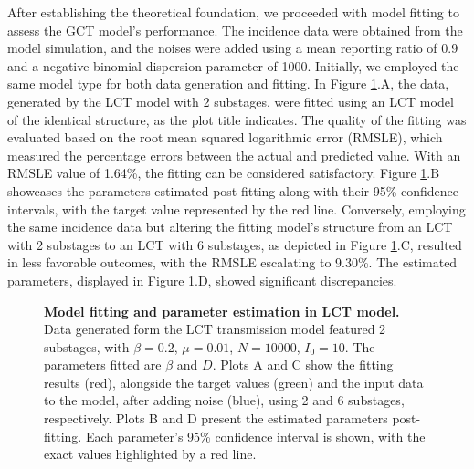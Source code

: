 \documentclass[12pt]{article}
\begin{document}
After establishing the theoretical foundation, we proceeded with model fitting to assess the GCT model's performance. The incidence data were obtained from the model simulation, and the noises were added using a mean reporting ratio of 0.9 and a negative binomial dispersion parameter of 1000. Initially, we employed the same model type for both data generation and fitting. In Figure \ref{sametypeFittingL}.A, the data, generated by the LCT model with 2 substages, were fitted using an LCT model of the identical structure, as the plot title indicates. The quality of the fitting was evaluated based on the root mean squared logarithmic error (RMSLE), which measured the percentage errors between the actual and predicted value. With an RMSLE value of 1.64\%, the fitting can be considered satisfactory. Figure \ref{sametypeFittingL}.B showcases the parameters estimated post-fitting along with their 95\% confidence intervals, with the target value represented by the red line. Conversely, employing the same incidence data but altering the fitting model's structure from an LCT with 2 substages to an LCT with 6 substages, as depicted in Figure \ref{sametypeFittingL}.C, resulted in less favorable outcomes, with the RMSLE escalating to 9.30\%. The estimated parameters, displayed in Figure \ref{sametypeFittingL}.D, showed significant discrepancies. 

\begin{figure}[h!]
    \centering
    \caption{\textbf{Model fitting and parameter estimation in LCT model.} \\ Data generated form the LCT transmission model featured 2 substages, with $\beta=0.2$, $\mu=0.01$, $N=10000$, $I_0=10$. The parameters fitted are $\beta$ and $D$. Plots A and C show the fitting results (red), alongside the target values (green) and the input data to the model, after adding noise (blue), using 2 and 6 substages, respectively. Plots B and D present the estimated parameters post-fitting. Each parameter's 95\% confidence interval is shown, with the exact values highlighted by a red line.}
    \label{sametypeFittingL}
\end{figure}
\end{document}
